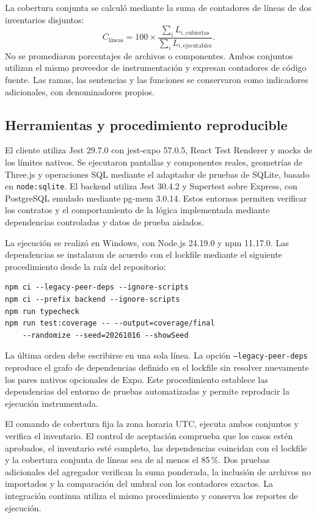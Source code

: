 La cobertura conjunta se calculó mediante la suma de contadores de líneas de dos inventarios disjuntos:
\[
C_{\mathrm{líneas}}=100\times
\frac{\sum_i L_{i,\mathrm{cubiertas}}}{\sum_i L_{i,\mathrm{ejecutables}}}.
\]
No se promediaron porcentajes de archivos o componentes. Ambos conjuntos utilizan el mismo proveedor de instrumentación y expresan contadores de código fuente. Las ramas, las sentencias y las funciones se conservaron como indicadores adicionales, con denominadores propios.

\subsection{Herramientas y procedimiento reproducible}

El cliente utiliza Jest 29.7.0 con jest-expo 57.0.5, React Test Renderer y mocks de los límites nativos. Se ejecutaron pantallas y componentes reales, geometrías de Three.js y operaciones SQL mediante el adaptador de pruebas de SQLite, basado en \texttt{node:sqlite}. El backend utiliza Jest 30.4.2 y Supertest sobre Express, con PostgreSQL emulado mediante pg-mem 3.0.14. Estos entornos permiten verificar los contratos y el comportamiento de la lógica implementada mediante dependencias controladas y datos de prueba aislados.

La ejecución se realizó en Windows, con Node.js 24.19.0 y npm 11.17.0. Las dependencias se instalaron de acuerdo con el lockfile mediante el siguiente procedimiento desde la raíz del repositorio:

\begin{verbatim}
npm ci --legacy-peer-deps --ignore-scripts
npm ci --prefix backend --ignore-scripts
npm run typecheck
npm run test:coverage -- --output=coverage/final 
    --randomize --seed=20261016 --showSeed
\end{verbatim}

La última orden debe escribirse en una sola línea. La opción \texttt{--legacy-peer-deps} reproduce el grafo de dependencias definido en el lockfile sin resolver nuevamente los pares nativos opcionales de Expo. Este procedimiento establece las dependencias del entorno de pruebas automatizadas y permite reproducir la ejecución instrumentada.

El comando de cobertura fija la zona horaria UTC, ejecuta ambos conjuntos y verifica el inventario. El control de aceptación comprueba que los casos estén aprobados, el inventario esté completo, las dependencias coincidan con el lockfile y la cobertura conjunta de líneas sea de al menos el 85\,\%. Dos pruebas adicionales del agregador verifican la suma ponderada, la inclusión de archivos no importados y la comparación del umbral con los contadores exactos. La integración continua utiliza el mismo procedimiento y conserva los reportes de ejecución.

